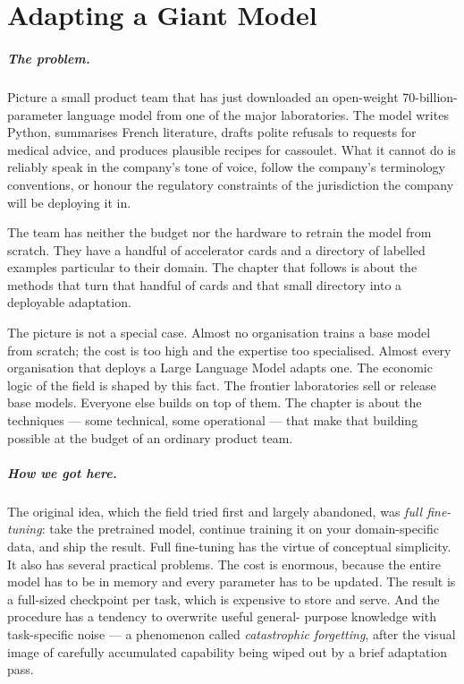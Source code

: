 
\chapter{Adapting a Giant Model}
\label{chap:adaptation}
\label{ntg:ch8}

\scenelabel
\begin{scenestrip}
\end{scenestrip}

\paragraph{The problem.} Picture a small product team that has just downloaded an
open-weight 70-billion-parameter language model from one of
the major laboratories. The model writes Python, summarises
French literature, drafts polite refusals to requests for
medical advice, and produces plausible recipes for cassoulet.
What it cannot do is reliably speak in the company's tone of
voice, follow the company's terminology conventions, or honour
the regulatory constraints of the jurisdiction the company will
be deploying it in.

The team has neither the budget nor the hardware to retrain the
model from scratch. They have a handful of accelerator cards
and a directory of labelled examples particular to their
domain. The chapter that follows is about the methods that turn
that handful of cards and that small directory into a deployable
adaptation.

The picture is not a special case. Almost no organisation
trains a base model from scratch; the cost is too high and the
expertise too specialised. Almost every organisation that
deploys a Large Language Model adapts one. The economic logic
of the field is shaped by this fact. The frontier laboratories
sell or release base models. Everyone else builds on top of
them. The chapter is about the techniques --- some technical,
some operational --- that make that building possible at the
budget of an ordinary product team.

\paragraph{How we got here.} The original idea, which the field tried first and largely
abandoned, was \emph{full fine-tuning}: take the pretrained
model, continue training it on your domain-specific data, and
ship the result. Full fine-tuning has the virtue of conceptual
simplicity. It also has several practical problems. The cost
is enormous, because the entire model has to be in memory and
every parameter has to be updated. The result is a full-sized
checkpoint per task, which is expensive to store and serve.
And the procedure has a tendency to overwrite useful general-
purpose knowledge with task-specific noise --- a phenomenon
called \emph{catastrophic forgetting}, after the visual image
of carefully accumulated capability being wiped out by a brief
adaptation pass.

